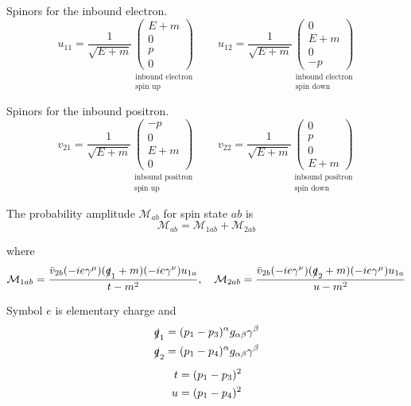 Spinors for the inbound electron.
\begin{equation*}
u_{11}=\frac{1}{\sqrt{E+m}}
\underset{\substack{\text{inbound electron}\\ \text{spin up}}}
{\begin{pmatrix}E+m\\0\\p\\0\end{pmatrix}}
\qquad
u_{12}=\frac{1}{\sqrt{E+m}}
\underset{\substack{\text{inbound electron}\\ \text{spin down}}}
{\begin{pmatrix}0\\E+m\\0\\-p\end{pmatrix}}
\end{equation*}

Spinors for the inbound positron.
\begin{equation*}
v_{21}=\frac{1}{\sqrt{E+m}}
\underset{\substack{\text{inbound positron}\\ \text{spin up}}}
{\begin{pmatrix}-p\\0\\E+m\\0\end{pmatrix}}
\qquad
v_{22}=\frac{1}{\sqrt{E+m}}
\underset{\substack{\text{inbound positron}\\ \text{spin down}}}
{\begin{pmatrix}0\\p\\0\\E+m\end{pmatrix}}
\end{equation*}

The probability amplitude $\mathcal M_{ab}$ for spin state $ab$ is
\begin{equation*}
\mathcal M_{ab}=\mathcal M_{1ab}+\mathcal M_{2ab}
\end{equation*}

where
\begin{equation*}
\mathcal M_{1ab}=\frac{\bar v_{2b}(-ie\gamma^\mu)(\slashed q_1+m)(-ie\gamma^\nu)u_{1a}}{t-m^2},
\quad
\mathcal M_{2ab}=\frac{\bar v_{2b}(-ie\gamma^\nu)(\slashed q_2+m)(-ie\gamma^\mu)u_{1a}}{u-m^2}
\end{equation*}

Symbol $e$ is elementary charge and
\begin{gather*}
\begin{aligned}
\slashed q_1&=(p_1-p_3)^\alpha g_{\alpha\beta}\gamma^\beta
\\
\slashed q_2&=(p_1-p_4)^\alpha g_{\alpha\beta}\gamma^\beta
\end{aligned}
\\[1ex]
\begin{aligned}
t&=(p_1-p_3)^2
\\
u&=(p_1-p_4)^2
\end{aligned}
\end{gather*}

